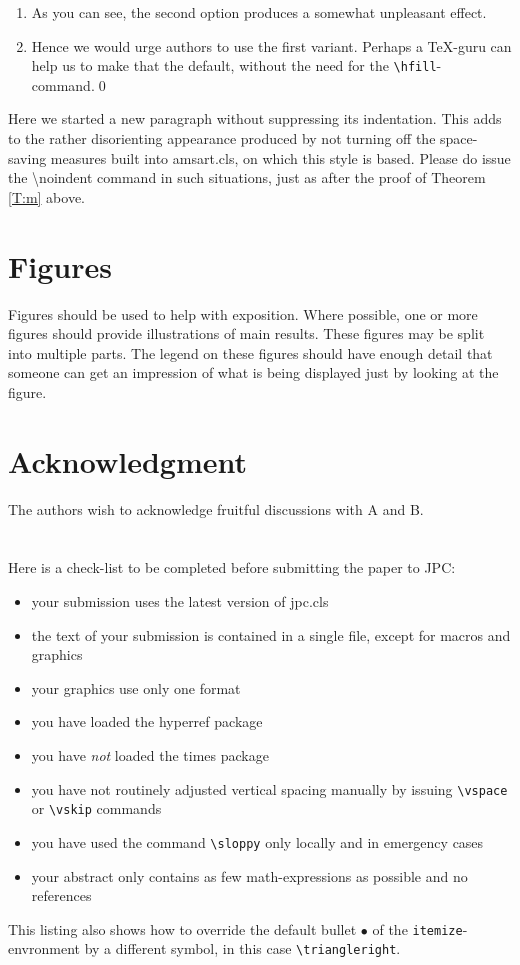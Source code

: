 \documentclass{jpc} %
\theoremstyle{plain}\newtheorem{satz}[thm]{Satz} %
\begin{document}
\proof %
\begin{enumerate}%
\item
  As you can see, the second option produces a somewhat unpleasant effect.
\item
  Hence we would urge authors to use the first variant.  Perhaps a
  \TeX-guru can help us to make that the default, without the need for
  the \texttt{\textbackslash hfill}-command.\qed
\end{enumerate}

  Here we started a new paragraph without suppressing its
  indentation.  This adds to the rather disorienting appearance
  produced by not turning off the space-saving measures built into
  amsart.cls, on which this style is based.  Please do issue the
  \hbox{\textbackslash noindent} command in such situations, just as
  after the proof of Theorem \ref{T:m} above.

\section{Figures}
Figures should be used to help with exposition. Where possible, one or more figures should provide illustrations of main results. These figures may be split into multiple parts. The legend on these figures should have enough detail that someone can get an impression of what is being displayed just by looking at the figure.

\section*{Acknowledgment}
  \noindent The authors wish to acknowledge fruitful discussions with
  A and B.





\appendix
\section{}
  Here is a check-list to be completed before submitting the paper to
  JPC:
\begin{itemize}[label=$\triangleright$]
\item your submission uses the latest version of jpc.cls
\item the text of your submission is contained in a single file,
  except for macros and graphics
\item your graphics use only one format
\item you have loaded the hyperref package
\item you have \emph{not} loaded the times package
\item you have not routinely adjusted vertical spacing manually by issuing
  \texttt{\textbackslash vspace} or \texttt{\textbackslash vskip} commands
\item you have used the command \texttt{\textbackslash sloppy} only
  locally and in emergency cases
\item your abstract only contains as few math-expressions as possible and no
  references
\end{itemize}

  This listing also shows how to override the default bullet $\bullet$
  of the \texttt{itemize}-envronment by a different symbol, in this
  case \texttt{\textbackslash triangleright}.
\end{document}
